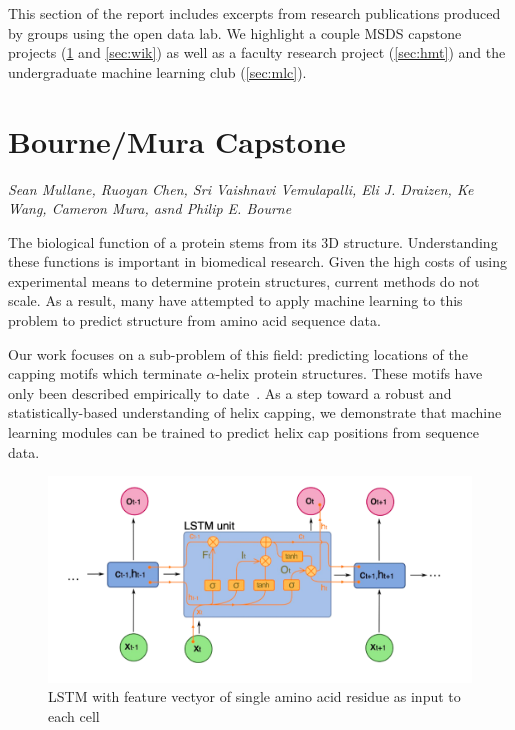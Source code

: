 This section of the report includes excerpts from research publications produced by groups using the open data lab. We highlight a couple MSDS capstone projects (\ref{sec:BMC} and \ref{sec:wik}) as well as a faculty research project (\ref{sec:hmt}) and the undergraduate machine learning club (\ref{sec:mlc}).

\pagebreak
\section{Bourne/Mura Capstone}
\label{sec:BMC}

\emph{Sean Mullane, Ruoyan Chen, Sri Vaishnavi Vemulapalli, Eli J. Draizen, Ke Wang, Cameron Mura, asnd Philip E. Bourne}
\bigskip

The biological function of a protein stems from its 3D structure. Understanding these functions is important in biomedical research. Given the high costs of using experimental means to determine protein structures, current methods do not scale. As a result, many have attempted to apply machine learning to this problem to predict structure from amino acid sequence data.

Our work focuses on a sub-problem of this field: predicting locations of the capping motifs which terminate $\alpha$-helix protein structures. These motifs have only been described empirically to date~\cite{ref:bmc}. As a step toward a robust and statistically-based understanding of helix capping, we demonstrate that machine learning modules can be trained to predict helix cap positions from sequence data.

\begin{figure}[!hbtp]
\includegraphics[width=\textwidth]{images/bmc1}
\caption{LSTM with feature vectyor of single amino acid residue as input to each cell}
\end{figure}

